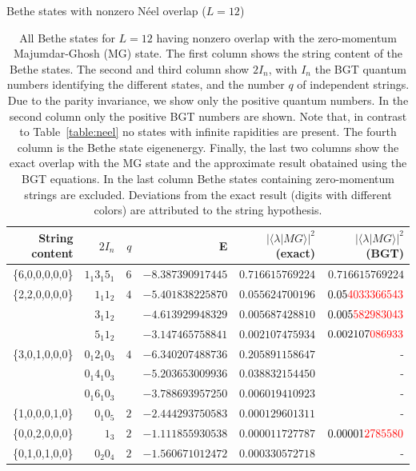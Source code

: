 \documentclass[11pt]{iopart}
\begin{document}
\begin{table}[h]
\scriptsize
\centering
Bethe states with nonzero N\'eel overlap ($L=12$)\\[1ex]
\begin{tabular}{rrrrrr}
\toprule
String content & $2I_n$ & $q$ & E & $|\langle\lambda|MG\rangle|^2$ (exact) & $|\langle\lambda|MG\rangle|^2$ (BGT) \\[0.3em]
\toprule
\{6,0,0,0,0,0\} &$1_1 3_1 5_1$ & $6$ & $-8.387390917445$ & $0.716615769224$ & $0.716615769224$\\
\midrule
\{2,2,0,0,0,0\} &$1_1 1_2$ & $4$ & $-5.401838225870$ & $0.055624700196$ & $0.05{\color{red}4033366543}$\\  
&$3_1 1_2 $ & & $-4.613929948329$ & $0.005687428810$ & $0.005{\color{red}582983043}$\\
&$5_1 1_2 $ &  & $-3.147465758841$ & $0.002107475934$ & $0.002107{\color{red}086933}$\\
\midrule
\{3,0,1,0,0,0\} &$0_1 2_1 0_3$ & $4$ & $-6.340207488736$ & $0.205891158647$ & -\\
  &$0_1 4_1 0_3$ & & $-5.203653009936$ & $0.038832154450$ & - \\
  &$0_1 6_1 0_3$ & & $-3.788693957250$ & $0.006019410923$ & - \\
\midrule
\{1,0,0,0,1,0\} &$0_1 0_5$ & $2$ & $-2.444293750583$ & $0.000129601311$ & - \\
\midrule
\{0,0,2,0,0,0\} &$1_3$ & $2$ & $-1.111855930538$ & $0.000011727787$ & $0.00001{\color{red}2785580}$\\
\midrule
\{0,1,0,1,0,0\} &$0_2 0_4$ & $2$ &  $-1.560671012472$ & $0.000330572718$ & - \\
\bottomrule
\end{tabular}
\caption{All Bethe states for $L=12$ having nonzero overlap with the zero-momentum Majumdar-Ghosh (MG) 
 state. The first column shows the string content of the Bethe states. The second and third column show 
 $2I_n$, with $I_n$ the BGT quantum numbers identifying the different states, and the number $q$ 
 of independent strings. Due to the parity invariance, we show only the positive quantum numbers. 
 In the second column only the positive BGT numbers are shown. Note that, in 
 contrast to Table~\ref{table:neel} no states with infinite rapidities are present. The fourth column 
 is the Bethe state eigenenergy. Finally, the last two columns show the exact overlap with the MG state 
 and the approximate result obatained using the BGT equations. In the last column Bethe states containing 
 zero-momentum strings are excluded. Deviations from the exact result (digits with different colors) 
 are attributed to the string hypothesis. 
}
\label{table:mg}
\end{table}
\end{document}
